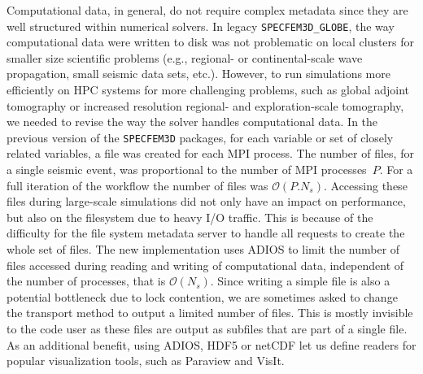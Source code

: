 Computational data, in general, do not require complex metadata since they are
well structured within numerical solvers. In legacy
\texttt{SPECFEM3D\_GLOBE}, the way computational data were written to disk was
not problematic on local clusters for smaller size scientific problems (e.g.,
regional- or continental-scale wave propagation, small seismic data sets, etc.).
However, to run simulations more efficiently on HPC systems for more challenging
problems, such as global adjoint tomography or increased resolution regional-
and exploration-scale tomography, we needed to revise the way the solver handles
computational data. In the previous version of the \texttt{SPECFEM3D} packages,
for each variable or set of closely related variables, a file was created for
each MPI process. The number of files, for a single seismic event, was
proportional to the number of MPI processes~$P$.  For a full iteration of the workflow
the number of files was $\mathcal{O}(P.N_{s})$. Accessing
these files during large-scale simulations did not only have an impact on
performance, but also on the filesystem due to heavy I/O traffic. This is because of
the difficulty for the file system metadata server to handle all requests to
create the whole set of files. The new implementation uses ADIOS to limit the
number of files accessed during reading and writing of computational data,
independent of the number of processes, that is $\mathcal{O}(N_{s})$. Since
writing a simple file is also a potential bottleneck due to lock contention, we
are sometimes asked to change the transport method to output a limited number of
files. This is mostly invisible to the code user as these files are output as
subfiles that are part of a single file. As an additional benefit, using ADIOS,
HDF5 or netCDF let us define readers for popular visualization tools, such
as Paraview and VisIt.

